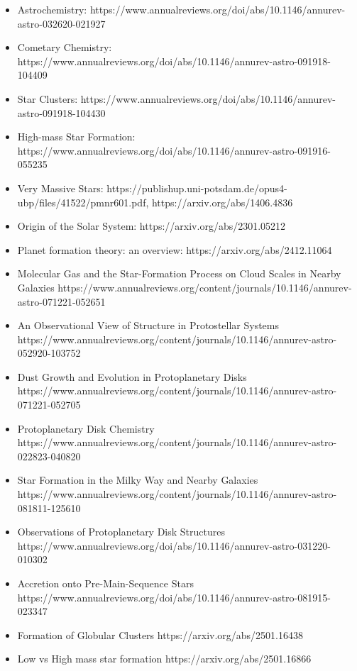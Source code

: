 \documentclass{article}
\begin{document}
\begin{itemize}
    \item Astrochemistry: https://www.annualreviews.org/doi/abs/10.1146/annurev-astro-032620-021927
    \item Cometary Chemistry: https://www.annualreviews.org/doi/abs/10.1146/annurev-astro-091918-104409
    \item Star Clusters: https://www.annualreviews.org/doi/abs/10.1146/annurev-astro-091918-104430
    \item High-mass Star Formation: https://www.annualreviews.org/doi/abs/10.1146/annurev-astro-091916-055235
    \item Very Massive Stars: https://publishup.uni-potsdam.de/opus4-ubp/files/41522/pmnr601.pdf,  https://arxiv.org/abs/1406.4836
    \item Origin of the Solar System: https://arxiv.org/abs/2301.05212
    \item Planet formation theory: an overview: https://arxiv.org/abs/2412.11064
    \item Molecular Gas and the Star-Formation Process on Cloud Scales in Nearby Galaxies
    https://www.annualreviews.org/content/journals/10.1146/annurev-astro-071221-052651
    \item An Observational View of Structure in Protostellar Systems
     https://www.annualreviews.org/content/journals/10.1146/annurev-astro-052920-103752
     \item Dust Growth and Evolution in Protoplanetary Disks
     https://www.annualreviews.org/content/journals/10.1146/annurev-astro-071221-052705
     \item Protoplanetary Disk Chemistry
     https://www.annualreviews.org/content/journals/10.1146/annurev-astro-022823-040820
\item Star Formation in the Milky Way and Nearby Galaxies
 https://www.annualreviews.org/content/journals/10.1146/annurev-astro-081811-125610
    \item Observations of Protoplanetary Disk Structures  https://www.annualreviews.org/doi/abs/10.1146/annurev-astro-031220-010302
    \item Accretion onto Pre-Main-Sequence Stars https://www.annualreviews.org/doi/abs/10.1146/annurev-astro-081915-023347
    \item Formation of Globular Clusters https://arxiv.org/abs/2501.16438
    \item Low vs High mass star formation https://arxiv.org/abs/2501.16866
\end{itemize}
\end{document}
